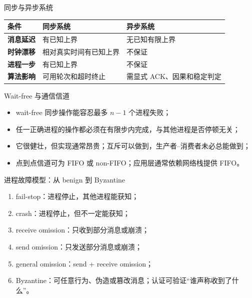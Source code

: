 \documentclass[UTF8,fontset=none,aspectratio=169,10pt]{beamer}
\begin{document}
\begin{frame}{同步与异步系统}
\begin{tabularx}{\linewidth}{>{\bfseries}p{2.2cm}XX}
\toprule
条件 & 同步系统 & 异步系统 \\
\midrule
消息延迟 & 有已知上界 & 无已知有限上界 \\
时钟漂移 & 相对真实时间有已知上界 & 不保证 \\
进程一步 & 有已知上界 & 不保证 \\
算法影响 & 可用轮次和超时终止 & 需显式 ACK、因果和稳定判定 \\
\bottomrule
\end{tabularx}
\vfill
{}
\end{frame}

\begin{frame}{Wait-free 与通信信道}
\begin{itemize}
  \item wait-free 同步操作能容忍最多 $n-1$ 个进程失败；
  \item 任一正确进程的操作都必须在有限步内完成，与其他进程是否停顿无关；
  \item 它很健壮，但实现通常昂贵；互斥可以做到，生产者--消费者未必总能做到；
  \item 点到点信道可为 FIFO 或 non-FIFO；应用层通常依赖网络栈提供 FIFO。
\end{itemize}
\end{frame}

\begin{frame}{进程故障模型：从 benign 到 Byzantine}
\begin{enumerate}
  \item fail-stop：进程停止，其他进程能获知；
  \item crash：进程停止，但不一定能获知；
  \item receive omission：只收到部分消息或崩溃；
  \item send omission：只发送部分消息或崩溃；
  \item general omission：send + receive omission；
  \item Byzantine：可任意行为、伪造或篡改消息；认证可验证“谁声称收到了什么”。
\end{enumerate}
\vfill
{}
\end{frame}
\end{document}
